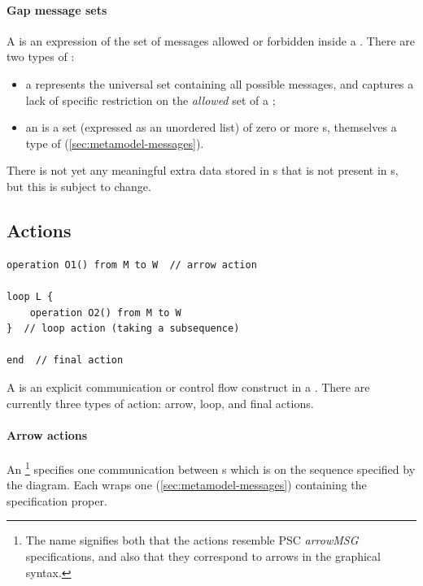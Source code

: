 \paragraph{Gap message sets}

A \mgapmessageset{} is an expression of the set of messages allowed or forbidden
inside a \msequencegap.  There are two types of \mgapmessageset:

\begin{itemize}
\item
	a \muniversegapmessageset{} represents the universal set containing 
	all possible messages, and
	captures a lack of specific restriction on
	the \emph{allowed} set of a \msequencegap;
\item	
	an \mextensionalgapmessageset{} is a set (expressed as an unordered list) of
	zero or more \mgapmessagespec s, themselves
	a type of \mmessagespec{} (\cref{sec:metamodel-messages}).
\end{itemize}

There is not yet any meaningful extra data stored in
\mgapmessagespec s that is not present in \mmessagespec s, but this is subject
to change.


\subsection{Actions}\label{sec:metamodel-sequences-actions}

\begin{lstlisting}[style=Example]
operation O1() from M to W  // arrow action

loop L {
	operation O2() from M to W
}  // loop action (taking a subsequence)

end  // final action
\end{lstlisting}

A \msequenceaction{} is an explicit communication or control flow construct in a
\msubsequence.  There are currently three types of action: arrow, loop, and
final actions.

\paragraph{Arrow actions}

An \marrowaction\footnote{The name signifies both that the actions resemble
PSC \emph{arrowMSG} specifications, and also that they correspond to arrows in
the graphical syntax.} specifies one communication between \mactor s which is on
the sequence specified by the diagram.  Each \marrowaction{} wraps one
\marrowmessagespec{} (\cref{sec:metamodel-messages})
containing the specification proper.

